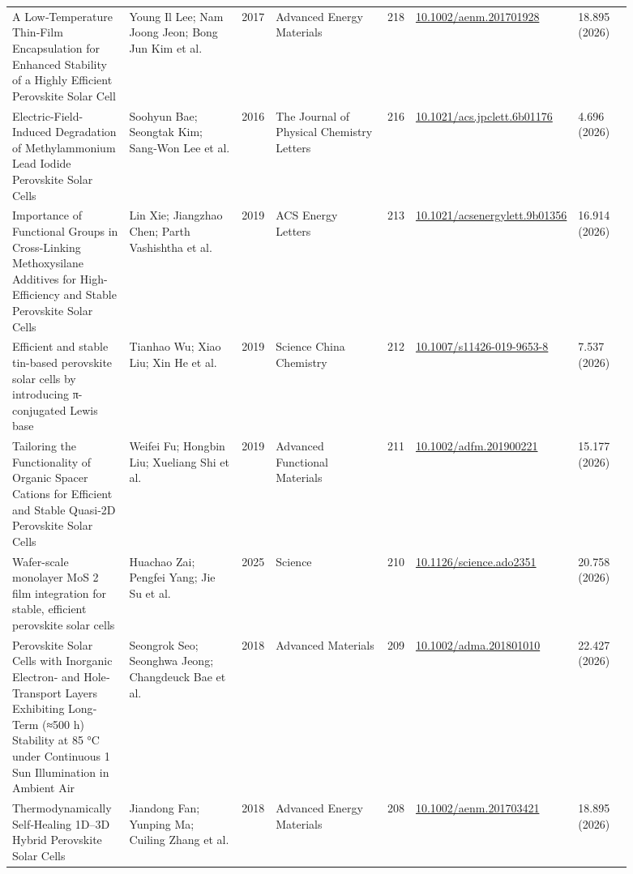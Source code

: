 \documentclass[10pt,a4paper]{article}
\begin{document}
{\begin{longtable}{p{0.197\linewidth}p{0.197\linewidth}p{0.043\linewidth}p{0.197\linewidth}p{0.043\linewidth}p{0.117\linewidth}p{0.098\linewidth}}
A Low‐Temperature Thin‐Film Encapsulation for Enhanced Stability of a Highly Efficient Perovskite Solar Cell & Young Il Lee; Nam Joong Jeon; Bong Jun Kim et al. & 2017 & Advanced Energy Materials & 218 & \href{https://doi.org/10.1002/aenm.201701928}{10.1002/aenm.201701928} & 18.895 (2026) \\
Electric-Field-Induced Degradation of Methylammonium Lead Iodide Perovskite Solar Cells & Soohyun Bae; Seongtak Kim; Sang‐Won Lee et al. & 2016 & The Journal of Physical Chemistry Letters & 216 & \href{https://doi.org/10.1021/acs.jpclett.6b01176}{10.1021/acs.jpclett.6b01176} & 4.696 (2026) \\
Importance of Functional Groups in Cross-Linking Methoxysilane Additives for High-Efficiency and Stable Perovskite Solar Cells & Lin Xie; Jiangzhao Chen; Parth Vashishtha et al. & 2019 & ACS Energy Letters & 213 & \href{https://doi.org/10.1021/acsenergylett.9b01356}{10.1021/acsenergylett.9b01356} & 16.914 (2026) \\
Efficient and stable tin-based perovskite solar cells by introducing π-conjugated Lewis base & Tianhao Wu; Xiao Liu; Xin He et al. & 2019 & Science China Chemistry & 212 & \href{https://doi.org/10.1007/s11426-019-9653-8}{10.1007/s11426-019-9653-8} & 7.537 (2026) \\
Tailoring the Functionality of Organic Spacer Cations for Efficient and Stable Quasi‐2D Perovskite Solar Cells & Weifei Fu; Hongbin Liu; Xueliang Shi et al. & 2019 & Advanced Functional Materials & 211 & \href{https://doi.org/10.1002/adfm.201900221}{10.1002/adfm.201900221} & 15.177 (2026) \\
Wafer-scale monolayer MoS 2 film integration for stable, efficient perovskite solar cells & Huachao Zai; Pengfei Yang; Jie Su et al. & 2025 & Science & 210 & \href{https://doi.org/10.1126/science.ado2351}{10.1126/science.ado2351} & 20.758 (2026) \\
Perovskite Solar Cells with Inorganic Electron‐ and Hole‐Transport Layers Exhibiting Long‐Term (≈500 h) Stability at 85 °C under Continuous 1 Sun Illumination in Ambient Air & Seongrok Seo; Seonghwa Jeong; Changdeuck Bae et al. & 2018 & Advanced Materials & 209 & \href{https://doi.org/10.1002/adma.201801010}{10.1002/adma.201801010} & 22.427 (2026) \\
Thermodynamically Self‐Healing 1D–3D Hybrid Perovskite Solar Cells & Jiandong Fan; Yunping Ma; Cuiling Zhang et al. & 2018 & Advanced Energy Materials & 208 & \href{https://doi.org/10.1002/aenm.201703421}{10.1002/aenm.201703421} & 18.895 (2026) \\

\end{longtable}}
\end{document}
